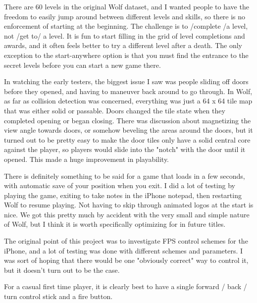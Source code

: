 \documentclass[book.tex]{subfiles}
\begin{document}
There are 60 levels in the original Wolf dataset, and I wanted people to have the freedom to easily jump around between different levels and skills, so there is no enforcement of starting at the beginning.  The challenge is to /complete /a level, not /get to/ a level.  It is fun to start filling in the grid of level completions and awards, and it often feels better to try a different level after a death.  The only exception to the start-anywhere option is that you must find the entrance to the secret levels before you can start a new game there.\\
\par

In watching the early testers, the biggest issue I saw was people sliding off doors before they opened, and having to maneuver back around to go through.  In Wolf, as far as collision detection was concerned, everything was just a 64 x 64 tile map that was either solid or passable.
Doors changed the tile state when they completed opening or began closing.  There was discussion about magnetizing the view angle towards doors, or somehow beveling the areas around the doors, but it turned out to be pretty easy to make the door tiles only have a solid central core against the player, so players would slide into the "notch" with the door until it opened.  This made a huge improvement in playability.\\
\par

There is definitely something to be said for a game that loads in a few seconds, with automatic save of your position when you exit.  I did a lot of testing by playing the game, exiting to take notes in the iPhone notepad, then restarting Wolf to resume playing.  Not having to skip through animated logos at the start is nice.  We got this pretty much by accident with the very small and simple nature of Wolf, but I think it is worth specifically optimizing for in future titles.\\
\par

The original point of this project was to investigate FPS control schemes for the iPhone, and a lot of testing was done with different schemes and parameters.  I was sort of hoping that there would be one "obviously correct" way to control it, but it doesn't turn out to be the case.\\
\par

For a casual first time player, it is clearly best to have a single forward / back / turn control stick and a fire button.\\
\par
\end{document}
